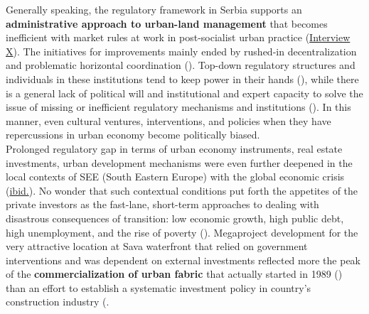 \documentclass[11pt]{report}
\begin{document}
Generally speaking, the regulatory framework in Serbia supports an \textbf{administrative approach to urban-land management} that becomes inefficient with market rules at work in post-socialist urban practice
(\href{InterviewX}{Interview X}).
The initiatives for improvements mainly ended by rushed-in decentralization and problematic horizontal coordination
(\cite{WOrldBank2015}).
Top-down regulatory structures and individuals in these institutions tend to keep power in their hands (\citealt{vujovic_belgrades_2007}), while there is a general lack of political will and institutional and expert capacity to solve the issue of missing or inefficient regulatory mechanisms and institutions (\citealt{zekovic_planning_2015}).
In this manner, even cultural ventures, interventions, and policies when they have repercussions in urban economy become politically biased.
\\

Prolonged regulatory gap in terms of urban economy instruments, real estate investments, urban development mechanisms were even further deepened in the local contexts of SEE (South Eastern Europe) with the global economic crisis 
(\href{Zekovic}{ibid.}).
No wonder that such contextual conditions put forth the appetites of the private investors as the fast-lane, short-term approaches to dealing with disastrous consequences of transition: low economic growth, high public debt, high unemployment, and the rise of poverty (\citealt{world_bank_cities_2000}).
Megaproject development for the very attractive location at Sava waterfront that relied on government interventions and was dependent on external investments reflected more the peak of the \textbf{commercialization of urban fabric} that actually started in 1989 (\citealt{hirt_belgrade_2009}) than an effort to establish a systematic investment policy in country's construction industry (\cite{WorldBank2013}.
\\
\end{document}
